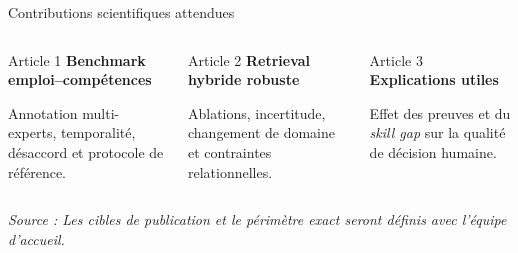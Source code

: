 \documentclass[aspectratio=169,11pt]{beamer}
\newcommand{\sourceNote}[1]{%
  \vfill\par\tiny\color{KmerDarkGray}\textit{Source : #1}\par
}
\begin{document}
\begin{frame}{Contributions scientifiques attendues}
  \begin{columns}[T,onlytextwidth]
      \begin{block}{Article 1}
        \textbf{Benchmark emploi--compétences}\par
        Annotation multi-experts, temporalité, désaccord et protocole de référence.
      \end{block}
      \begin{block}{Article 2}
        \textbf{Retrieval hybride robuste}\par
        Ablations, incertitude, changement de domaine et contraintes relationnelles.
      \end{block}
      \begin{block}{Article 3}
        \textbf{Explications utiles}\par
        Effet des preuves et du \textit{skill gap} sur la qualité de décision humaine.
      \end{block}
  \end{columns}
  \vspace{0.28cm}
  \begin{center}
  \end{center}
  \sourceNote{Les cibles de publication et le périmètre exact seront définis avec l'équipe d'accueil.}
\end{frame}
\end{document}
